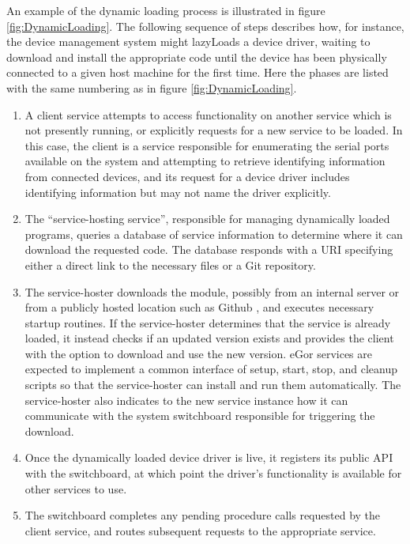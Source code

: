\documentclass[../thesis]{subfiles}
\begin{document}
An example of the dynamic loading process is illustrated in figure
\ref{fig:DynamicLoading}. The following sequence of steps describes
how, for instance, the device management system might \glspl{lazyLoad} a
device driver, waiting to download and install the appropriate code
until the device has been physically connected to a given host machine
for the first time. Here the phases are listed with the same numbering
as in figure \ref{fig:DynamicLoading}.

\begin{enumerate}
  \item{
      A client service attempts to access functionality on another
      service which is not presently running, or explicitly requests for
      a new service to be loaded. In this case, the client is a service
      responsible for enumerating the serial ports available on the
      system and attempting to retrieve identifying information from
      connected devices, and its request for a device driver includes
      identifying information but may not name the driver explicitly.
  }
  \item{
      The ``service-hosting service'', responsible for managing
      dynamically loaded programs, queries a database of service
      information to determine where it can download the requested
      code. The database responds with a \gls{URI} specifying either a
      direct link to the necessary files or a Git repository.
  }
  \item{
      The service-hoster downloads the module, possibly from an
      internal server or from a publicly hosted location such as
      Github \cite{Github}, and executes necessary startup
      routines. If the service-hoster determines that the service is
      already loaded, it instead checks if an updated version exists
      and provides the client with the option to download and use the
      new version. eGor services are expected to implement a common
      interface of setup, start, stop, and cleanup scripts so that the
      service-hoster can install and run them automatically. The
      service-hoster also indicates to the new service instance how it
      can communicate with the system switchboard responsible for
      triggering the download.
  }
  \item{
      Once the dynamically loaded device driver is live, it registers its
      public \gls{API} with the switchboard, at which point the
      driver's functionality is available for other services to use.
  }
  \item{
      The switchboard completes any pending procedure calls requested
      by the client service, and routes subsequent requests to the
      appropriate service.
  }
\end{enumerate}
\end{document}
